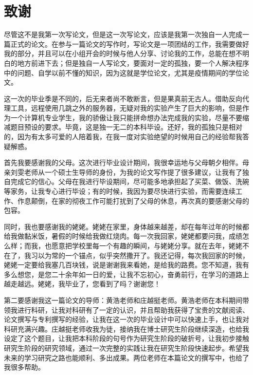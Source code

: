 
\clearpage
{}
{}

\chapter*{致谢}
尽管这不是我第一次写论文，但是这一次写论文，应该是我第一次独自一人完成一篇正式的论文。在参与一篇论文的写作时，写论文是一项团结的工作，我需要做好我的部分，并且可以在小组开会的时候与他人分享、讨论我的工作，总能在想不明白的地方前进下去；但是独自一人写论文，要面对一定的孤独，要一个人解决程序中的问题、自学以前不懂的知识，因为这就是学位论文，尤其是疫情期间的学位论文。

这一次的毕业季是不同的，后无来者尚不敢断言，但是果真前无古人。借助反向代理工具，远程使用几跳之外的服务器，无疑对我的实验产生了巨大的影响，但是作为一个计算机专业学生，我的骄傲让我只能拼命想办法完成我的实验，尽量不要缩减题目预设的要求。毕竟，这是独一无二的本科毕设。还好，我的孤独只是相对的，因为有太多可爱的人陪着我，在我一度对实验绝望的时候用自己的经验帮我答疑解惑。

首先我要感谢我的父母。这次进行毕业设计期间，我很幸运地与父母朝夕相伴。母亲刘雯老师从一个硕士生导师的身份，为我的论文写作提了很多建议，让我有了独自完成它的信心。父母在我进行毕设期间，尽可能多地承担起了买菜、做饭、洗碗等家务，让我专心进行毕设；有的时候，我因为要尽快进行实验，而需要连续工作、作息颠倒，在家的彻夜工作可能打扰到了父母的休息，再次真的要感谢父母的包容。

同时，我也要感谢我的姥姥。姥姥在家里，身体越来越差，却在每年过年的时候都给我做黏米饭，暑假的时候给我做红烧肉。每一次我回家，姥姥都要问我，成绩怎么样；而我，也愿意把学校里每一个有趣的瞬间，与姥姥分享。就在去年，姥姥不在了，我习以为常的一个锚点，似乎突然撒开了。我还记得，每次我回家的时候，姥姥一定要给我塞几百块钱，说是谢谢我来看她，是给我的路费。您不知道，我有多么想您，是您二十余年如一日的爱，让我不忘初心，奋勇前行，在学习的道路上越走越远。姥姥，我毕业了，您看到了吗？谢谢您！

第二要感谢我这一篇论文的导师：黄浩老师和庄越挺老师。黄浩老师在本科期间带领我进行科研，让我对科研有了一定的认识，并且帮助我获得了宝贵的文献阅读、论文撰写与专利撰写的经验，让我在这一次的毕业设计中可以快速上手，也让我对科研充满兴趣。庄越挺老师收我为徒，接纳我在博士研究生阶段继续深造，也给我设定了这个题目，让我把本科阶段的句号作为研究生阶段的破折号，让我初步接触研究生阶段的研究领域，通过一次完整的实践让我在研究生阶段快速起步。希望我未来的学习研究之路也能顺利、多出成果。两位老师在本篇论文的撰写中，也给了我很多帮助。

